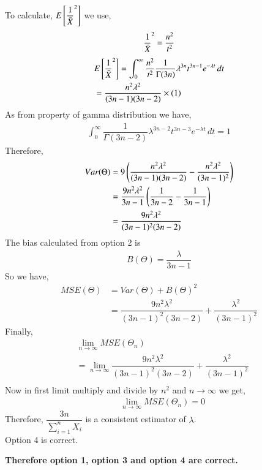 \begin{enumerate}
     To calculate, $E \left[   {\dfrac{1}{\Bar{X}}}^2  \right] $ we use,
     \begin{align}
          {\dfrac{1}{\Bar{X}}}^2 = \dfrac{n^2}{t^2}
     \end{align}
     \begin{align}
        &  E \left[   {\dfrac{1}{\Bar{X}}}^2  \right] = \int_{0}^{\infty} \dfrac{n^2}{t^2} \dfrac{1}{\Gamma(3n)} \lambda^{3n}t^{3n-1}e^{-\lambda t}\,dt \\
          &= \dfrac{n^2\lambda^2}{(3n-1)(3n-2)} \times (1)
     \end{align}
     As from property of gamma distribution we have,
     \begin{align}
         \int_{0}^{\infty} \dfrac{1}{\Gamma(3n-2)} \lambda^{3n-2}t^{3n-3}e^{-\lambda t}\,dt = 1
     \end{align}
    Therefore,
    \begin{align}
        Var(\Theta) &= 9\left(\dfrac{n^2\lambda^2}{(3n-1)(3n-2)} - \dfrac{n^2\lambda^2}{(3n-1)^2}\right) \\
        &= \dfrac{9n^2\lambda^2}{3n-1} \left(\dfrac{1}{3n-2}- \dfrac{1}{3n-1}\right) \\
        &= \dfrac{9n^2\lambda^2}{(3n-1)^2(3n-2)}
    \end{align}
    The bias calculated from option 2 is 
    \begin{align}
        B(\Theta) = \dfrac{\lambda}{3n-1}
    \end{align}
    So we have, 
    \begin{align}
        MSE(\Theta) &= Var(\Theta) + B(\Theta)^2 \\
        &= \dfrac{9n^2\lambda^2}{(3n-1)^2(3n-2)} + \dfrac{\lambda^2}{(3n-1)^2}
    \end{align}
    Finally,
    \begin{align}
        & \lim_{n\to\infty} MSE( \Theta_n) \\
         &= \lim_{n\to\infty} \dfrac{9n^2\lambda^2}{(3n-1)^2(3n-2)} + \dfrac{\lambda^2}{(3n-1)^2} \\
    \end{align}
    Now in first limit multiply and divide by $ n^2$ and $ {n\to\infty} $ we get,
    \begin{align}
         & \lim_{n\to\infty} MSE( \Theta_n) =0
    \end{align}
    Therefore, $\dfrac{3n}{\sum_{i=1}^{n} X_i} $ is a consistent estimator of $ \lambda$. \\
    Option 4 is correct. \\
    \end{enumerate}
    \textbf{Therefore option 1, option 3 and option 4 are correct.}